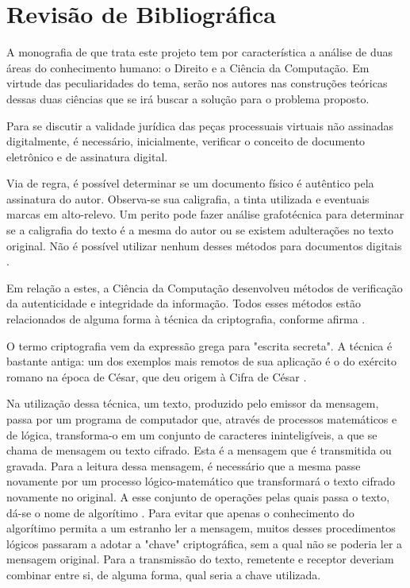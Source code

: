 \chapter{Revisão de Bibliográfica}

  A monografia de que trata este projeto tem por característica a
  análise de duas áreas do conhecimento humano: o Direito e a
  Ciência da Computação. Em virtude das peculiaridades do tema,
  serão nos autores nas construções teóricas dessas duas ciências
  que se irá buscar a solução para o problema proposto.\par

  Para se discutir a validade jurídica das peças processuais
  virtuais não assinadas digitalmente, é necessário,
  inicialmente, verificar o conceito de documento eletrônico e de
  assinatura digital.\par

  Via de regra, é possível determinar se um documento físico é
  autêntico pela assinatura do autor. Observa-se sua caligrafia,
  a tinta utilizada e eventuais marcas em alto-relevo. Um perito
  pode fazer análise grafotécnica para determinar se a caligrafia
  do texto é a mesma do autor ou se existem adulterações no texto
  original. Não é possível utilizar nenhum desses métodos para
  documentos digitais \cite{ComputerNetworks, CertificadoDigital}.\par

  Em relação a estes, a Ciência da Computação desenvolveu métodos
  de verificação da autenticidade e integridade da informação.
  Todos esses métodos estão relacionados de alguma forma à
  técnica da criptografia, conforme afirma
  .\par

  O termo criptografia vem da expressão grega para "escrita
  secreta". A técnica é bastante antiga: um dos exemplos mais
  remotos de sua aplicação é o do exército romano na época de
  César, que deu origem à Cifra de César \cite[p.
  555]{ComputerNetworks}.\par

  Na utilização dessa técnica, um texto, produzido pelo emissor da
  mensagem, passa por um programa de computador que, através de
  processos matemáticos e de lógica, transforma-o em um conjunto de
  caracteres ininteligíveis, a que se chama de mensagem ou texto
  cifrado.  Esta é a mensagem que é transmitida ou gravada. Para
  a leitura dessa mensagem, é necessário que a mesma passe
  novamente por um processo lógico-matemático que transformará o
  texto cifrado novamente no original. A esse conjunto de
  operações pelas quais passa o texto, dá-se o nome de
  algorítimo \cite{ComputerNetworks}. Para evitar que apenas o
  conhecimento do algorítimo permita a um estranho ler a
  mensagem, muitos desses procedimentos lógicos passaram a adotar
  a "chave" criptográfica, sem a qual não se poderia ler a
  mensagem original. Para a transmissão do texto, remetente e
  receptor deveriam combinar entre si, de alguma forma, qual
  seria a chave utilizada.\par

